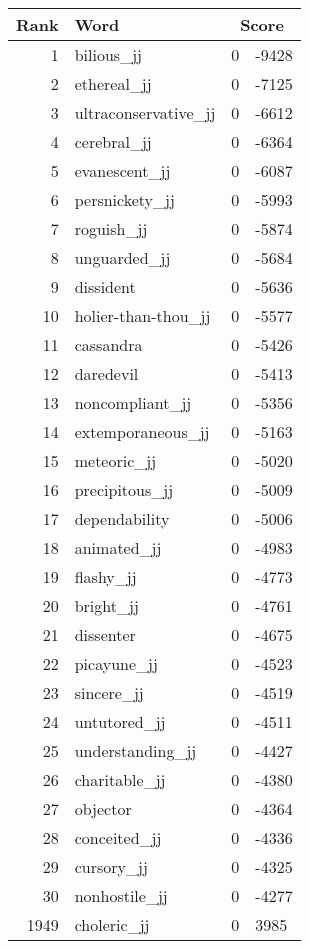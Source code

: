\begin{longtable}[!htbp]{| rlr@{.}l |}
    \hline
    \textbf{Rank} & \textbf{Word} & \multicolumn{2}{c|}{\textbf{Score}} \\
    \hline
    \endhead
    1 & bilious\_jj & 0 & -9428 \\
    2 & ethereal\_jj & 0 & -7125 \\
    3 & ultraconservative\_jj & 0 & -6612 \\
    4 & cerebral\_jj & 0 & -6364 \\
    5 & evanescent\_jj & 0 & -6087 \\
    6 & persnickety\_jj & 0 & -5993 \\
    7 & roguish\_jj & 0 & -5874 \\
    8 & unguarded\_jj & 0 & -5684 \\
    9 & dissident & 0 & -5636 \\
    10 & holier-than-thou\_jj & 0 & -5577 \\
    11 & cassandra & 0 & -5426 \\
    12 & daredevil & 0 & -5413 \\
    13 & noncompliant\_jj & 0 & -5356 \\
    14 & extemporaneous\_jj & 0 & -5163 \\
    15 & meteoric\_jj & 0 & -5020 \\
    16 & precipitous\_jj & 0 & -5009 \\
    17 & dependability & 0 & -5006 \\
    18 & animated\_jj & 0 & -4983 \\
    19 & flashy\_jj & 0 & -4773 \\
    20 & bright\_jj & 0 & -4761 \\
    21 & dissenter & 0 & -4675 \\
    22 & picayune\_jj & 0 & -4523 \\
    23 & sincere\_jj & 0 & -4519 \\
    24 & untutored\_jj & 0 & -4511 \\
    25 & understanding\_jj & 0 & -4427 \\
    26 & charitable\_jj & 0 & -4380 \\
    27 & objector & 0 & -4364 \\
    28 & conceited\_jj & 0 & -4336 \\
    29 & cursory\_jj & 0 & -4325 \\
    30 & nonhostile\_jj & 0 & -4277 \\
    1949 & choleric\_jj & 0 & 3985 \\

\end{longtable}
